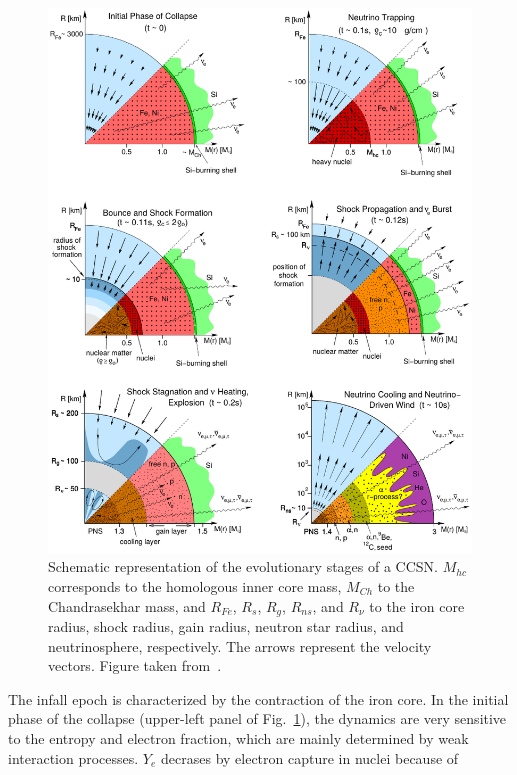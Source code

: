 \begin{figure}[!t]
\begin{center}
  \includegraphics[width=0.965\linewidth]{figures/sn_intro.png}
\end{center}
\caption[Schematic representation of the evolutionary stages of a core collapse
supernova]{Schematic representation of the evolutionary stages of a CCSN.
  $M_{hc}$ corresponds to the homologous inner core mass, $M_{Ch}$ to the
  Chandrasekhar mass, and $R_{Fe}$, $R_s$, $R_g$, $R_{ns}$, and $R_\nu$ to the 
  iron core radius, shock radius, gain radius, neutron star radius, and 
  neutrinosphere, respectively. The arrows represent the velocity vectors. 
  Figure taken from~\cite{Janka2007}.}\label{fig:sn_intro}
\end{figure}
%
The infall epoch is characterized by the contraction of the iron core. 
In the initial phase of the collapse (upper-left panel of 
Fig.~\ref{fig:sn_intro}), the dynamics are very sensitive to the entropy and
electron fraction, which are mainly determined by weak interaction processes.
$Y_e$ decrases by electron capture in nuclei because of 
